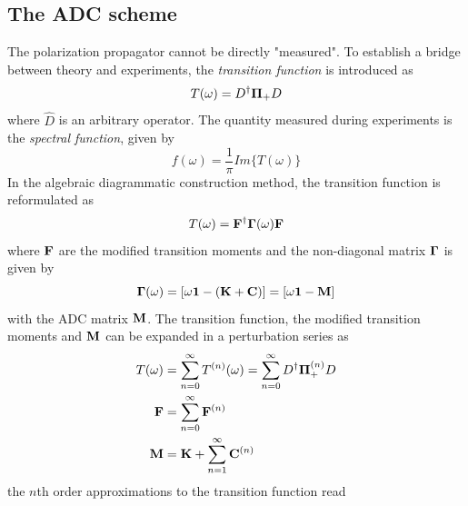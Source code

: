 \subsection{The ADC scheme}

The polarization propagator cannot be directly "measured". To establish a bridge between theory and experiments, the \emph{transition function} is introduced as
\begin{equation}
T(\omega) = D^{\dagger} \boldsymbol{\Pi}_{+} D 
\end{equation}
\noindent where $\hat{D}$ is an arbitrary operator. The quantity measured during experiments is the \emph{spectral function}, given by
\begin{equation}
f(\omega) = \frac{1}{\pi}Im\{T(\omega)\}
\end{equation}
In the algebraic diagrammatic construction method, the transition function is reformulated as
\begin{equation}
T(\omega) = \mathbf{F}^{\dagger} \mathbf{\Gamma}(\omega) \mathbf{F}
\end{equation}
\noindent where $\mathbf{F}$ are the modified transition moments and the non-diagonal matrix $\mathbf{\Gamma}$ is given by
\begin{equation}
\mathbf{\Gamma}(\omega) = \left[ \omega \mathbf{1} - (\mathbf{K} + \mathbf{C}) \right] = \left[ \omega \mathbf{1} - \mathbf{M} \right]
\end{equation}
\noindent with the ADC matrix $\mathbf{M}$. The transition function, the modified transition moments and $\mathbf{M}$ can be expanded in a perturbation series as
\begin{align}
T(\omega) &= \sum_{n=0}^{\infty} T^{(n)}(\omega) = \sum_{n=0}^{\infty} D^{\dagger} \boldsymbol{\Pi}_{+}^{(n)} D \\
\mathbf{F} &= \sum_{n=0}^{\infty} \mathbf{F}^{(n)} \\
\mathbf{M} &= \mathbf{K} + \sum_{n=1}^{\infty} \mathbf{C}^{(n)}
\end{align} 
\noindent the $n$th order approximations to the transition function read

